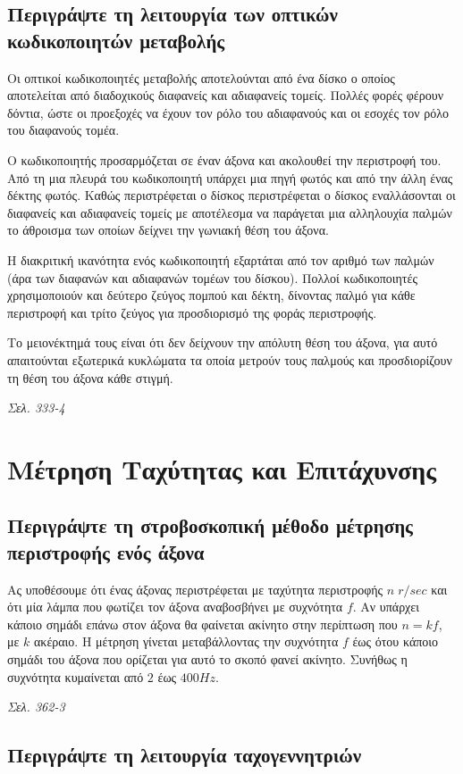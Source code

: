 \documentclass{article}
\begin{document}
\subsection{Περιγράψτε τη λειτουργία των οπτικών κωδικοποιητών μεταβολής}
Οι οπτικοί κωδικοποιητές μεταβολής αποτελούνται από ένα δίσκο ο οποίος αποτελείται από διαδοχικούς διαφανείς και αδιαφανείς τομείς. Πολλές φορές φέρουν δόντια, ώστε οι
προεξοχές να έχουν τον ρόλο του αδιαφανούς και οι εσοχές τον ρόλο του διαφανούς τομέα. 

Ο κωδικοποιητής προσαρμόζεται σε έναν άξονα και ακολουθεί την περιστροφή του. Από τη μια πλευρά του κωδικοποιητή υπάρχει μια πηγή φωτός και από την άλλη ένας δέκτης φωτός.
Καθώς περιστρέφεται ο δίσκος περιστρέφεται ο δίσκος εναλλάσονται οι διαφανείς και αδιαφανείς τομείς με αποτέλεσμα να παράγεται μια αλληλουχία παλμών το άθροισμα των οποίων 
δείχνει την γωνιακή θέση του άξονα. 

Η διακριτική ικανότητα ενός κωδικοποιητή εξαρτάται από τον αριθμό των παλμών (άρα των διαφανών και αδιαφανών τομέων του δίσκου). Πολλοί κωδικοποιητές χρησιμοποιούν 
και δεύτερο ζεύγος πομπού και δέκτη, δίνοντας παλμό για κάθε περιστροφή και τρίτο ζεύγος για προσδιορισμό της φοράς περιστροφής. 

Το μειονέκτημά τους είναι ότι δεν δείχνουν την απόλυτη θέση του άξονα, για αυτό απαιτούνται εξωτερικά κυκλώματα τα οποία μετρούν τους παλμούς και προσδιορίζουν τη θέση του
άξονα κάθε στιγμή.

\emph{Σελ. 333-4}


\section{Μέτρηση Ταχύτητας και Επιτάχυνσης}
\subsection{Περιγράψτε τη στροβοσκοπική μέθοδο μέτρησης περιστροφής ενός άξονα}
Ας υποθέσουμε ότι ένας άξονας περιστρέφεται με ταχύτητα περιστροφής $n\;r/sec$ και ότι μία λάμπα που φωτίζει τον άξονα αναβοσβήνει με συχνότητα $f$. Αν υπάρχει κάποιο 
σημάδι επάνω στον άξονα θα φαίνεται ακίνητο στην περίπτωση που $n=kf$, με $k$ ακέραιο. Η μέτρηση γίνεται μεταβάλλοντας την συχνότητα $f$ έως ότου κάποιο σημάδι του άξονα
που ορίζεται για αυτό το σκοπό φανεί ακίνητο. Συνήθως η συχνότητα κυμαίνεται από $2$ έως $400 Ηz$.

\emph{Σελ. 362-3}

\subsection{Περιγράψτε τη λειτουργία ταχογεννητριών}
\end{document}
